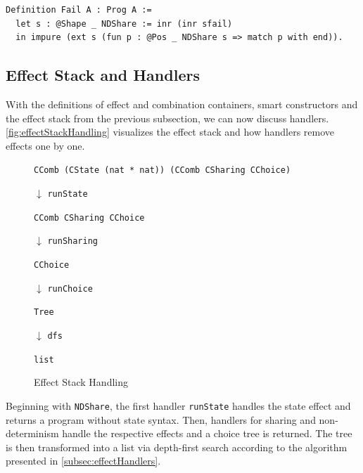 \documentclass[a4paper, 11pt, fleqn, twoside, abstract=on]{scrreprt}
\newcommand{\cinl}[1]{\texttt{#1}}
\begin{document}
\begin{verbatim}
Definition Fail A : Prog A :=
  let s : @Shape _ NDShare := inr (inr sfail)
  in impure (ext s (fun p : @Pos _ NDShare s => match p with end)).
\end{verbatim}

\subsection{Effect Stack and Handlers}
\label{subsec:effectstack}

With the definitions of effect and combination containers, smart constructors and the effect stack from the previous subsection, we can now discuss handlers.
\autoref{fig:effectStackHandling} visualizes the effect stack and how handlers remove effects one by one.

\begin{figure}[H]
{\centering \cinl{CComb (CState (nat * nat)) (CComb CSharing CChoice)} \par}

\hspace*{.48\textwidth} {\Large \boldmath $\downarrow$} \texttt{runState}

{\centering \cinl{CComb CSharing CChoice} \par}

\hspace*{.48\textwidth} {\Large \boldmath $\downarrow$} \texttt{runSharing}

{\centering \cinl{CChoice} \par}

\hspace*{.48\textwidth} {\Large \boldmath $\downarrow$} \texttt{runChoice}

{\centering \cinl{Tree} \par}

\hspace*{.48\textwidth} {\Large \boldmath $\downarrow$} \texttt{dfs}

{\centering \cinl{list} \par}
\caption{Effect Stack Handling}
\label{fig:effectStackHandling}
\end{figure}

Beginning with \cinl{NDShare}, the first handler \cinl{runState} handles the state effect and returns a program without state syntax.
Then, handlers for sharing and non-determinism handle the respective effects and a choice tree is returned.
The tree is then transformed into a list via depth-first search according to the algorithm presented in \autoref{subsec:effectHandlers}.
\end{document}
